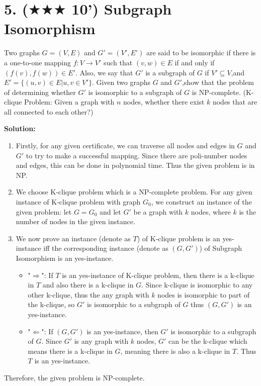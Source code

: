 \documentclass{article}
\begin{document}
\pagebreak
\section*{5. ($\bigstar\bigstar\bigstar$ 10') Subgraph Isomorphism}
Two graphs $G = (V, E)$ and $G' = (V', E')$ are said to be isomorphic if there is a one-to-one mapping $f:V \rightarrow V'$ such that $(v,w)\in E$ if and only if $(f(v),f(w))\in E'$. Also, we say that $G'$ is a subgraph of $G$ if $V' \subseteq V$,and $E' =\{(u,v)\in E | u,v \in V'\}$. Given two graphs $G$ and $G'$,show that the problem of determining whether $G'$ is isomorphic to a subgraph of $G$ is NP-complete. (K-clique Problem: Given a graph with $n$ nodes, whether there exist $k$ nodes that are all connected to each other?)
{
\color{blue}
\par\textbf{Solution: }
\begin{enumerate}
	\item Firstly, for any given certificate, we can traverse all nodes and edges in $G$ and $G'$ to try to make a successful mapping. Since there are poli-number nodes and edges, this can be done in polynomial time. Thus the given problem is in NP.
	\item We choose K-clique problem which is a NP-complete problem. For any given instance of K-clique problem with graph $G_0$, we construct an instance of the given problem: let $G = G_0$ and let $G'$ be a graph with $k$ nodes, where $k$ is the number of nodes in the given instance.
	\item We now prove an instance (denote as $T$) of K-clique problem is an yes-instance iff the corresponding instance (denote as $(G,G')$) of Subgraph Isomorphism is an yes-instance.
	\begin{itemize}
		\item "$\Rightarrow$": If $T$ is an yes-instance of K-clique problem, then there is a k-clique in $T$ and also there is a k-clique in $G$. Since k-clique is isomorphic to any other k-clique, thus the any graph with $k$ nodes is isomorphic to part of the k-clique, so $G'$ is isomorphic to a subgraph of $G$ thus $(G,G')$ is an yes-instance.
		\item "$\Leftarrow$": If $(G,G')$ is an yes-instance, then $G'$ is isomorphic to a subgraph of $G$. Since $G'$ is any graph with $k$ nodes, $G'$ can be the k-clique which means there is a k-clique in $G$, meaning there is also a k-clique in $T$. Thus $T$ is an yes-instance.
	\end{itemize} 
\end{enumerate}
\par Therefore, the given problem is NP-complete.
}
\end{document}
